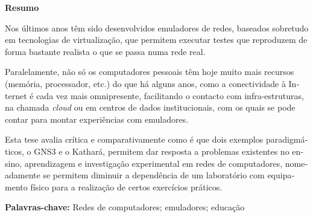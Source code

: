 
\cleardoublepage\thispagestyle{plain}

\begin{otherlanguage}{portuguese}
  \textbf{\Large Resumo}

  Nos últimos anos têm sido desenvolvidos emuladores de redes, baseados sobretudo em tecnologias de virtualização, que permitem executar testes que reproduzem de forma bastante realista o que se passa numa rede real.

  Paralelamente, não só os computadores pessoais têm hoje muito mais recursos (memória, processador, etc.) do que há alguns anos, como a conectividade à Internet é cada vez mais omnipresente, facilitando o contacto com infra-estruturas, na chamada \emph{cloud} ou em centros de dados institucionais, com os quais se pode contar para montar experiências com emuladores.

  Esta tese avalia crítica e comparativamente como é que dois exemplos paradigmáticos, o GNS3 e o Kathará, permitem dar resposta a problemas existentes no ensino, aprendizagem e investigação experimental em redes de computadores, nomeadamente se permitem diminuir a dependência de um laboratório com equipamento físico para a realização de certos exercícios práticos.

  \textbf{Palavras-chave:} Redes de computadores; emuladores; educação
\end{otherlanguage}
